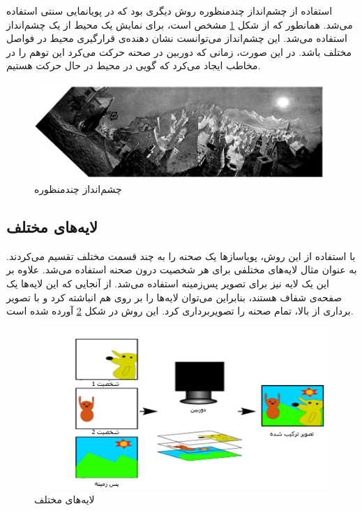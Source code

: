 استفاده از چشم‌انداز چندمنظوره روش دیگری بود که در پویانمایی سنتی استفاده می‌شد.
همانطور که از شکل
\ref{fig:Panorama}
مشخص است، برای نمایش یک محیط از یک چشم‌انداز استفاده می‌شد.
این چشم‌انداز می‌توانست نشان دهنده‌ی قرارگیری محیط در فواصل مختلف باشد. در این صورت، زمانی که 
دوربین در صحنه حرکت می‌کرد این توهم را در مخاطب ایجاد می‌کرد که گویی در محیط در حال حرکت هستیم.

\begin{figure}[ht]
	\centerline{\includegraphics[width=\textwidth,height=\textheight,keepaspectratio]{Figures/Ch1/Panorama.png}}

	\caption{چشم‌انداز چندمنظوره \cite{Wood1997Multiperspective}}
	\label{fig:Panorama}
\end{figure}


\subsection{لایه‌های مختلف}

با استفاده از این روش، پویاسازها یک صحنه را به چند قسمت مختلف تقسیم می‌کردند.
به عنوان مثال لایه‌های مختلفی برای هر شخصیت درون صحنه استفاده می‌شد. علاوه بر این یک لایه نیز برای تصویر پس‌زمینه استفاده می‌شد.
از آنجایی که این لایه‌ها یک صفحه‌ی شفاف هستند، بنابراین می‌توان لایه‌‌ها را 
بر روی هم انباشته کرد و با تصویر برداری از بالا، تمام صحنه را تصویربرداری کرد.
این روش در شکل 
\ref{fig:DifferentLayers}
آورده شده است.

\begin{figure}[ht]
	\centerline{\includegraphics[width=\textwidth,height=\textheight,keepaspectratio]{Figures/Ch1/DifferentLayers.png}}

	\caption{لایه‌های مختلف\cite{AnimationCellsWikipedia}}
	\label{fig:DifferentLayers}
\end{figure}

